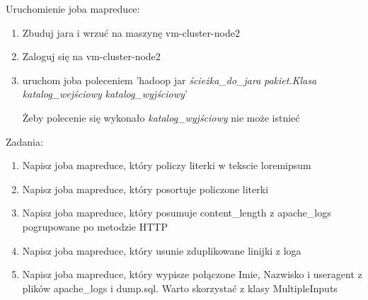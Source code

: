 \documentclass[11pt]{article}
\begin{document}
Uruchomienie joba mapreduce:
\begin{enumerate}
\item Zbuduj jara i wrzuć na maszynę vm-cluster-node2
\item Zaloguj się na vm-cluster-node2
\item uruchom joba poleceniem 'hadoop jar \textit{ścieżka\_do\_jara} \textit{pakiet.Klasa} \textit{katalog\_wejściowy} \textit{katalog\_wyjściowy}'

Żeby polecenie się wykonało \textit{katalog\_wyjściowy} nie może istnieć
\end{enumerate}

Zadania:
\begin{enumerate}
\item Napisz joba mapreduce, który policzy literki w tekscie loremipsum
\item Napisz joba mapreduce, który posortuje policzone literki
\item Napisz joba mapreduce, który posumuje content_length z apache_logs pogrupowane po metodzie HTTP
\item Napisz joba mapreduce, który usunie zduplikowane linijki z loga
\item Napisz joba mapreduce, który wypisze połączone Imie, Nazwisko i useragent z plików apache_logs i dump.sql. Warto skorzystać z klasy MultipleInputs
\end{enumerate}
\end{document}
